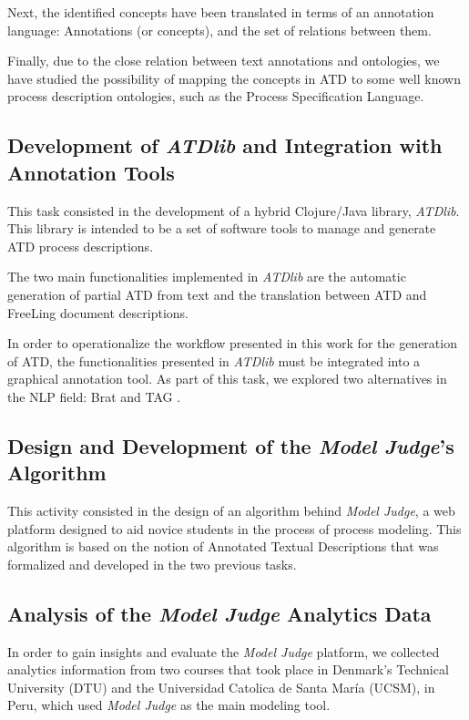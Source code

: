 Next, the identified concepts have been translated in terms of an annotation
language: Annotations (or concepts), and the set of relations between them. 

Finally, due to the close relation between text annotations and ontologies, we
have studied the possibility of mapping the concepts in ATD to some well known
process description ontologies, such as the Process Specification
Language\cite{gruninger2003process}.

\subsection*{Development of \emph{ATDlib} and Integration with Annotation Tools}

This task consisted in the development of a hybrid Clojure/Java library, \emph{ATDlib}.
This library is intended to be a set of software tools to manage and generate
ATD process descriptions.

The two main functionalities implemented in \emph{ATDlib} are the automatic
generation of partial ATD from text and the translation between ATD and
FreeLing\cite{PadroS12} document descriptions.

In order to operationalize the workflow presented in this work for the
generation of ATD, the functionalities presented in \emph{ATDlib} must be
integrated into a graphical annotation tool. As part of this task, we explored
two alternatives in the NLP field: Brat\cite{stenetorp2012brat} and TAG
\cite{DBLP:journals/corr/abs-1711-00529}.

\subsection*{Design and Development of the \emph{Model Judge}'s Algorithm}

This activity consisted in the design of an algorithm behind \emph{Model Judge},
a web platform designed to aid novice students in the process of process
modeling. This algorithm is based on the notion of Annotated Textual
Descriptions that was formalized and developed in the two previous tasks.

\subsection*{Analysis of the \emph{Model Judge} Analytics Data}

In order to gain insights and evaluate the \emph{Model Judge} platform, we
collected analytics information from two courses that took place in
Denmark's Technical University (DTU) and the Universidad Catolica de Santa
Mar\'ia (UCSM), in Peru, which used \emph{Model Judge} as the main
modeling tool.

